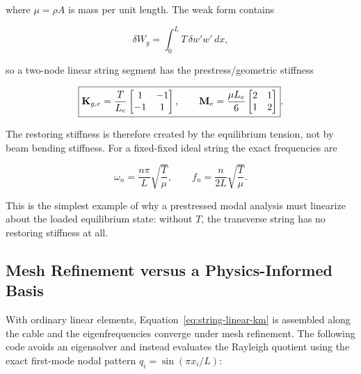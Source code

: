 where $\mu=\rho A$ is mass per unit length.  The weak form contains

\begin{equation}
    \delta W_g
    =\int_0^L T\,\delta w' w'\,dx,
\end{equation}

so a two-node linear string segment has the prestress/geometric stiffness

\begin{equation}\label{eq:string-linear-km}
    \boxed{
    \mathbf{K}_{g,e}=\frac{T}{L_e}
    \begin{bmatrix}1&-1\\-1&1\end{bmatrix},
    \qquad
    \mathbf{M}_{e}=\frac{\mu L_e}{6}
    \begin{bmatrix}2&1\\1&2\end{bmatrix}
    }.
\end{equation}

The restoring stiffness is therefore created by the equilibrium tension, not by
beam bending stiffness.  For a fixed-fixed ideal string the exact frequencies
are

\begin{equation}\label{eq:string-exact-freq}
    \boxed{
    \omega_n=\frac{n\pi}{L}\sqrt{\frac{T}{\mu}},
    \qquad
    f_n=\frac{n}{2L}\sqrt{\frac{T}{\mu}}
    }.
\end{equation}

This is the simplest example of why a prestressed modal analysis must linearize
about the loaded equilibrium state: without $T$, the transverse string has no
restoring stiffness at all.

\subsection{Mesh Refinement versus a Physics-Informed Basis}

With ordinary linear elements, Equation~\eqref{eq:string-linear-km} is assembled
along the cable and the eigenfrequencies converge under mesh refinement.  The
following code avoids an eigensolver and instead evaluates the Rayleigh quotient
using the exact first-mode nodal pattern $q_i=\sin(\pi x_i/L)$:

